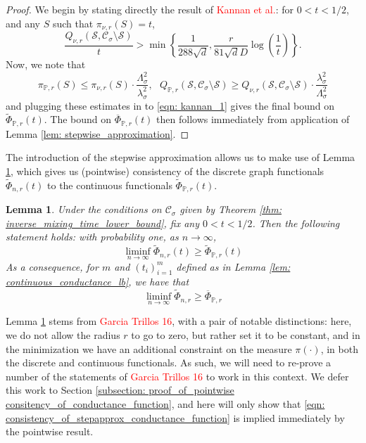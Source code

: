 \documentclass{article}
\newcommand{\1}{\mathbf{1}}
\newcommand{\Pbb}{\mathbb{P}}
\newcommand{\Sset}{\mathcal{S}}
\newcommand{\Cset}{\mathcal{C}}
\newcommand{\Csig}{\Cset_{\sigma}}
\theoremstyle{aldenthm}
\newtheorem{lemma}{Lemma}
\begin{document}
\begin{proof}
	We begin by stating directly the result of \textcolor{red}{Kannan et al.}: for $0 < t < 1/2$, and any $S$ such that $\pi_{\nu,r}(S) = t$,
	\begin{equation}
	\label{eqn: kannan_1}
	\frac{Q_{\nu,r}(\Sset, \Csig \setminus \Sset)}{t} > \min\left\{\frac{1}{288\sqrt{d}},\frac{r}{81 \sqrt{d}D}\log\left(\frac{1}{t}\right)\right\}.
	\end{equation}
	Now, we note that
	\begin{equation*}
	\pi_{\Pbb,r}(S) \leq \pi_{\nu,r}(S) \cdot \frac{\Lambda_{\sigma}^2}{\lambda_{\sigma}^2}, ~~~ Q_{\Pbb,r}(\Sset, \Csig \setminus \Sset) \geq Q_{\nu,r}(\Sset, \Csig \setminus \Sset) \cdot \frac{\lambda_{\sigma}^2}{\Lambda_{\sigma}^2}
	\end{equation*}
	and plugging these estimates in to \eqref{eqn: kannan_1} gives the final bound on $\widetilde{\Phi}_{\Pbb,r}(t)$.  The bound on $\overline{\Phi}_{\Pbb,r}(t)$ then follows immediately from application of Lemma \ref{lem: stepwise_approximation}.
\end{proof}

The introduction of the stepwise approximation allows us to make use of Lemma \ref{lem: consistency_of_conductance_function}, which gives us (pointwise) consistency of the discrete graph functionals $\widetilde{\Phi}_{n,r}(t)$ to the continuous functionals $\widetilde{\Phi}_{\Pbb,r}(t)$. 

\begin{lemma}
	\label{lem: consistency_of_conductance_function}
	Under the conditions on $\Csig$ given by Theorem \ref{thm: inverse_mixing_time_lower_bound}, fix any $0 < t < 1/2$. Then the following statement holds: with probability one, as $n \to \infty$,
	\begin{equation*}
	\liminf_{n \to \infty} \widetilde{\Phi}_{n,r}(t) \geq \widetilde{\Phi}_{\Pbb,r}(t)
	\end{equation*}
	As a consequence, for $m$ and $(t_i)_{i=1}^{m}$ defined as in Lemma \ref{lem: continuous_conductance_lb}, we have that
	\begin{equation}
	\label{eqn: consistency_of_stepapprox_conductance_function}
	\liminf_{n \to \infty} \widetilde{\Phi}_{n,r} \geq \overline{\Phi}_{\Pbb,r}
	\end{equation}
\end{lemma}
Lemma \ref{lem: consistency_of_conductance_function} stems from \textcolor{red}{Garcia Trillos 16}, with a pair of notable distinctions: here, we do not allow the radius $r$ to go to zero, but rather set it to be constant, and in the minimization we have an additional constraint on the measure $\pi(\cdot)$, in both the discrete and continuous functionals. As such, we will need to re-prove a number of the statements of \textcolor{red}{Garcia Trillos 16} to work in this context. We defer this work to Section \ref{subsection: proof_of_pointwise consitency_of_conductance_function}, and here will only show that  \eqref{eqn: consistency_of_stepapprox_conductance_function} is implied immediately by the pointwise result. 
\end{document}
